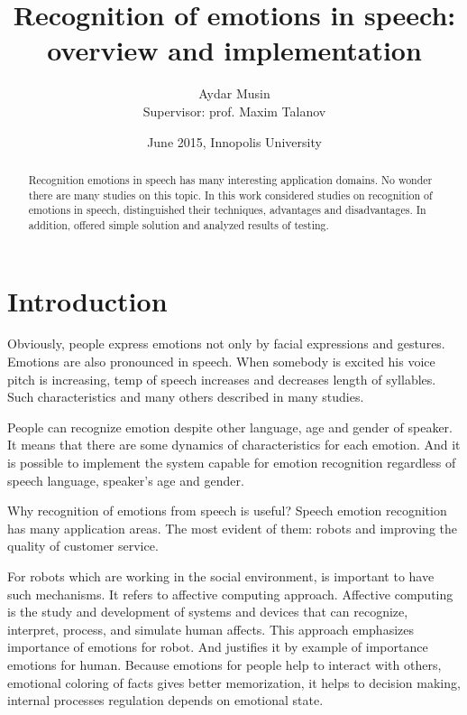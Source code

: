\documentclass[14pt]{extarticle}
\title{Recognition of emotions in speech:\\overview and implementation}
\author{Aydar Musin\\Supervisor: prof. Maxim Talanov}
\date{June 2015, Innopolis University}
\begin{document}
\begin{titlepage}
\maketitle
\end{titlepage}

\tableofcontents
\begin{abstract}
	Recognition emotions in speech has many interesting application domains. No wonder there are many studies on this topic. In this work considered studies on recognition of emotions in speech, distinguished their techniques, advantages and disadvantages. In addition, offered simple solution and analyzed results of testing.
\end{abstract}

\section{Introduction}
Obviously, people express emotions not only by facial expressions and gestures. Emotions are also pronounced in speech. When somebody is excited his voice pitch is increasing, temp of speech increases and decreases length of syllables. Such characteristics and many others described in many studies. 

People can recognize emotion despite other language, age and gender of speaker. It means that there are some dynamics of characteristics for each emotion. And it is possible to implement the system capable for emotion recognition regardless of speech language, speaker's age and gender.

Why recognition of emotions from speech is useful? Speech emotion recognition has many application areas. The most evident of them: robots and improving the quality of customer service.

For robots which are working in the social environment, is important to have such mechanisms. It refers to affective computing approach. Affective computing is the study and development of systems and devices that can recognize, interpret, process, and simulate human affects\cite{affective}. This approach emphasizes importance of emotions for robot. And justifies it by example of importance emotions for human. Because emotions for people help to interact with others, emotional coloring of facts gives better memorization, it helps to decision making, internal processes regulation depends on emotional state.
\end{document}
